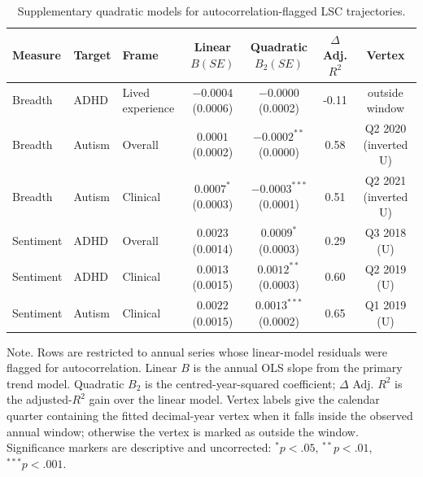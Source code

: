 \begin{table}[htbp]
\centering
\caption{Supplementary quadratic models for autocorrelation-flagged LSC trajectories.}
\label{tab:lsc-quadratic-diagnostics}
\scriptsize
\setlength{\tabcolsep}{3pt}
\begin{tabular}{@{}lllcccc@{}}
\toprule
Measure & Target & Frame & Linear $B(SE)$ & Quadratic $B_2(SE)$ & $\Delta$ Adj. $R^2$ & Vertex \\
\midrule
Breadth & ADHD & Lived experience & $-0.0004$ (0.0006) & $-0.0000$ (0.0002) & -0.11 & outside window \\
Breadth & Autism & Overall & $0.0001$ (0.0002) & $-0.0002^{**}$ (0.0000) & 0.58 & Q2 2020 (inverted U) \\
Breadth & Autism & Clinical & $0.0007^{*}$ (0.0003) & $-0.0003^{***}$ (0.0001) & 0.51 & Q2 2021 (inverted U) \\
Sentiment & ADHD & Overall & $0.0023$ (0.0014) & $0.0009^{*}$ (0.0003) & 0.29 & Q3 2018 (U) \\
Sentiment & ADHD & Clinical & $0.0013$ (0.0015) & $0.0012^{**}$ (0.0003) & 0.60 & Q2 2019 (U) \\
Sentiment & Autism & Clinical & $0.0022$ (0.0015) & $0.0013^{***}$ (0.0002) & 0.65 & Q1 2019 (U) \\
\bottomrule
\end{tabular}
\parbox{\linewidth}{\footnotesize Note. Rows are restricted to annual series whose linear-model residuals were flagged for autocorrelation. Linear $B$ is the annual OLS slope from the primary trend model. Quadratic $B_2$ is the centred-year-squared coefficient; $\Delta$ Adj. $R^2$ is the adjusted-$R^2$ gain over the linear model. Vertex labels give the calendar quarter containing the fitted decimal-year vertex when it falls inside the observed annual window; otherwise the vertex is marked as outside the window. Significance markers are descriptive and uncorrected: $^{*}p<.05$, $^{**}p<.01$, $^{***}p<.001$.}
\end{table}
